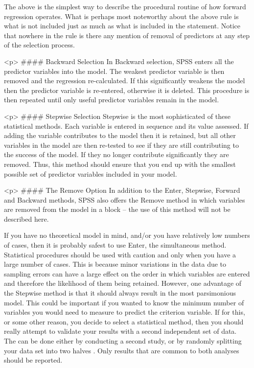 The above is the simplest way to describe the procedural routine of how forward regression operates. What is perhaps most noteworthy about the above rule is what is not included just as much as what is included in the statement. Notice that nowhere in the rule is there any mention of removal of predictors at any step of the selection process. 


<p>
#### {Backward Selection}
In Backward selection, SPSS enters all the predictor variables into the model. The weakest predictor variable is then removed and the regression re-calculated. If this significantly weakens the model then the predictor variable is re-entered, otherwise it is deleted. This procedure is then repeated until only useful predictor variables remain in the model.


<p>
#### {Stepwise Selection}
Stepwise is the most sophisticated of these statistical methods. Each variable is entered in sequence and its value assessed. If adding the variable contributes to the model then it is retained, but all other variables in the model are then re-tested to see if they are still contributing to the success of the model. If they no longer contribute significantly they are removed. Thus, this method should ensure that you end up with the smallest possible set of predictor variables included in your model.

<p>
#### {The Remove Option}
In addition to the Enter, Stepwise, Forward and Backward methods, SPSS also offers the Remove method in which variables are removed from the model in a block – the use of this method will not be described here.


If you have no theoretical model in mind, and/or you have relatively low numbers
of cases, then it is probably safest to use Enter, the simultaneous method. Statistical
procedures should be used with caution and only when you have a large number of
cases. This is because minor variations in the data due to sampling errors can have a
large effect on the order in which variables are entered and therefore the likelihood
of them being retained. However, one advantage of the Stepwise method is that it
should always result in the most parsimonious model. This could be important if
you wanted to know the minimum number of variables you would need to measure
to predict the criterion variable. If for this, or some other reason, you decide to
select a statistical method, then you should really attempt to validate your results
with a second independent set of data. The can be done either by conducting a
second study, or by randomly splitting your data set into two halves . Only results that are common to both analyses should be reported.

